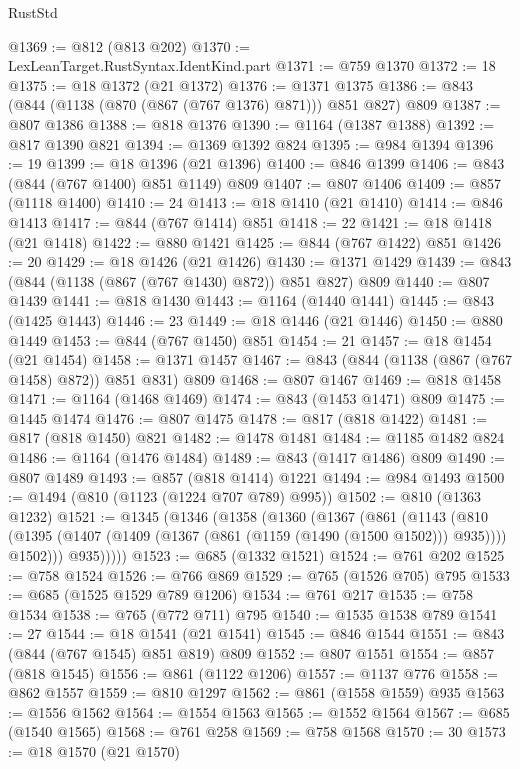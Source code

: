 \begin{lexlean}{RustStd}
\begin{coremodule}
@1369 := @812 (@813 @202)
@1370 := LexLeanTarget.RustSyntax.IdentKind.part
@1371 := @759 @1370
@1372 := 18
@1375 := @18 @1372 (@21 @1372)
@1376 := @1371 @1375
@1386 := @843 (@844 (@1138 (@870 (@867 (@767 @1376) @871))) @851 @827) @809
@1387 := @807 @1386
@1388 := @818 @1376
@1390 := @1164 (@1387 @1388)
@1392 := @817 @1390 @821
@1394 := @1369 @1392 @824
@1395 := @984 @1394
@1396 := 19
@1399 := @18 @1396 (@21 @1396)
@1400 := @846 @1399
@1406 := @843 (@844 (@767 @1400) @851 @1149) @809
@1407 := @807 @1406
@1409 := @857 (@1118 @1400)
@1410 := 24
@1413 := @18 @1410 (@21 @1410)
@1414 := @846 @1413
@1417 := @844 (@767 @1414) @851
@1418 := 22
@1421 := @18 @1418 (@21 @1418)
@1422 := @880 @1421
@1425 := @844 (@767 @1422) @851
@1426 := 20
@1429 := @18 @1426 (@21 @1426)
@1430 := @1371 @1429
@1439 := @843 (@844 (@1138 (@867 (@767 @1430) @872)) @851 @827) @809
@1440 := @807 @1439
@1441 := @818 @1430
@1443 := @1164 (@1440 @1441)
@1445 := @843 (@1425 @1443)
@1446 := 23
@1449 := @18 @1446 (@21 @1446)
@1450 := @880 @1449
@1453 := @844 (@767 @1450) @851
@1454 := 21
@1457 := @18 @1454 (@21 @1454)
@1458 := @1371 @1457
@1467 := @843 (@844 (@1138 (@867 (@767 @1458) @872)) @851 @831) @809
@1468 := @807 @1467
@1469 := @818 @1458
@1471 := @1164 (@1468 @1469)
@1474 := @843 (@1453 @1471) @809
@1475 := @1445 @1474
@1476 := @807 @1475
@1478 := @817 (@818 @1422)
@1481 := @817 (@818 @1450) @821
@1482 := @1478 @1481
@1484 := @1185 @1482 @824
@1486 := @1164 (@1476 @1484)
@1489 := @843 (@1417 @1486) @809
@1490 := @807 @1489
@1493 := @857 (@818 @1414) @1221
@1494 := @984 @1493
@1500 := @1494 (@810 (@1123 (@1224 @707 @789) @995))
@1502 := @810 (@1363 @1232)
@1521 := @1345
    (@1346
      (@1358
        (@1360
          (@1367
            (@861
              (@1143
                (@810
                  (@1395 (@1407 (@1409 (@1367 (@861 (@1159 (@1490 (@1500 @1502))) @935)))) @1502)))
              @935)))))
@1523 := @685 (@1332 @1521)
@1524 := @761 @202
@1525 := @758 @1524
@1526 := @766 @869
@1529 := @765 (@1526 @705) @795
@1533 := @685 (@1525 @1529 @789 @1206)
@1534 := @761 @217
@1535 := @758 @1534
@1538 := @765 (@772 @711) @795
@1540 := @1535 @1538 @789
@1541 := 27
@1544 := @18 @1541 (@21 @1541)
@1545 := @846 @1544
@1551 := @843 (@844 (@767 @1545) @851 @819) @809
@1552 := @807 @1551
@1554 := @857 (@818 @1545)
@1556 := @861 (@1122 @1206)
@1557 := @1137 @776
@1558 := @862 @1557
@1559 := @810 @1297
@1562 := @861 (@1558 @1559) @935
@1563 := @1556 @1562
@1564 := @1554 @1563
@1565 := @1552 @1564
@1567 := @685 (@1540 @1565)
@1568 := @761 @258
@1569 := @758 @1568
@1570 := 30
@1573 := @18 @1570 (@21 @1570)

\end{coremodule}
\end{lexlean}
